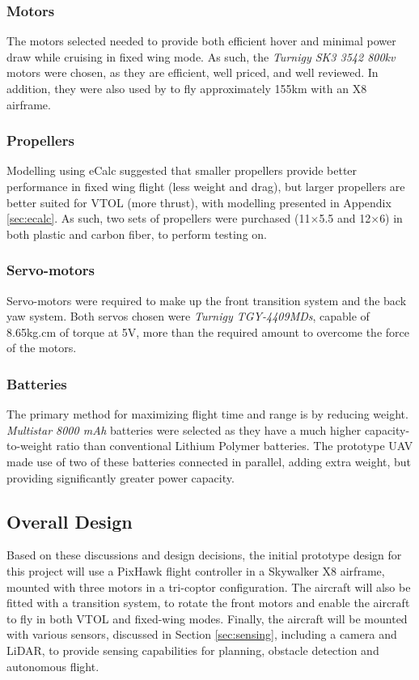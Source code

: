 \subsubsection*{Motors}
The motors selected needed to provide both efficient hover and minimal power draw while cruising in fixed wing mode. As such, the \textit{Turnigy SK3 3542 800kv} motors were chosen, as they are efficient, well priced, and well reviewed. In addition, they were also used by \cite{ref:fireflyinstruction} to fly approximately 155km with an X8 airframe.
	
\subsubsection*{Propellers}
Modelling using eCalc suggested that smaller propellers provide better performance in fixed wing flight (less weight and drag), but larger propellers are better suited for VTOL (more thrust), with modelling presented in Appendix \ref{sec:ecalc}. As such, two sets of propellers were purchased (11$\times$5.5 and 12$\times$6) in both plastic and carbon fiber, to perform testing on.
	
\subsubsection*{Servo-motors}
Servo-motors were required to make up the front transition system and the back yaw system. Both servos chosen were \textit{Turnigy TGY-4409MDs}, capable of 8.65kg.cm of torque at 5V, more than the required amount to overcome the force of the motors. 
		
\subsubsection*{Batteries}
The primary method for maximizing flight time and range is by reducing weight. \textit{Multistar 8000 mAh} batteries were selected as they have a much higher capacity-to-weight ratio than conventional Lithium Polymer batteries. The prototype UAV made use of two of these batteries connected in parallel, adding extra weight, but providing significantly greater power capacity.

\subsection{Overall Design}
Based on these discussions and design decisions, the initial prototype design for this project will use a PixHawk flight controller in a Skywalker X8 airframe, mounted with three motors in a tri-coptor configuration. The aircraft will also be fitted with a transition system, to rotate the front motors and enable the aircraft to fly in both VTOL and fixed-wing modes. Finally, the aircraft will be mounted with various sensors, discussed in Section \ref{sec:sensing}, including a camera and LiDAR, to provide sensing capabilities for planning, obstacle detection and autonomous flight.\\

